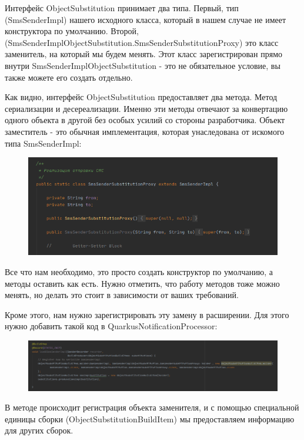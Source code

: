 \documentclass[russian,11pt]{article}
\begin{document}
Интерфейс ObjectSubstitution принимает два типа. Первый, тип (SmsSenderImpl) нашего исходного класса, который в нашем случае не имеет конструктора по умолчанию. Второй, (SmsSenderImplObjectSubstitution.SmsSenderSubstitutionProxy) это класс заменитель, на который мы будем менять. Этот класс зарегистрирован прямо внутри SmsSenderImplObjectSubstitution - это не обязательное условие, вы также можете его создать отдельно.

Как видно, интерфейс ObjectSubstitution предоставляет два метода. Метод сериализации и десереализации. Именно эти методы отвечают за конвертацию одного объекта в другой без особых усилий со стороны разработчика. 
	Объект заместитель - это обычная имплементация, которая унаследована от искомого типа SmsSenderImpl:

\begin{figure}[H]
	\centering
	\includegraphics[width=\textwidth]{23}
\end{figure}

Все что нам необходимо, это просто создать конструктор по умолчанию, а методы оставить как есть. Нужно отметить, что работу методов тоже можно менять, но делать это стоит в зависимости от ваших требований.

\newpage
Кроме этого, нам нужно зарегистрировать эту замену в расширении. Для этого нужно добавить такой код в QuarkusNotificationProcessor:

\begin{figure}[H]
	\centering
	\includegraphics[width=\textwidth]{24}
\end{figure}

В методе происходит регистрация объекта заменителя, и с помощью специальной единицы сборки (ObjectSubstitutionBuildItem) мы предоставляем информацию для других сборок.
\end{document}
